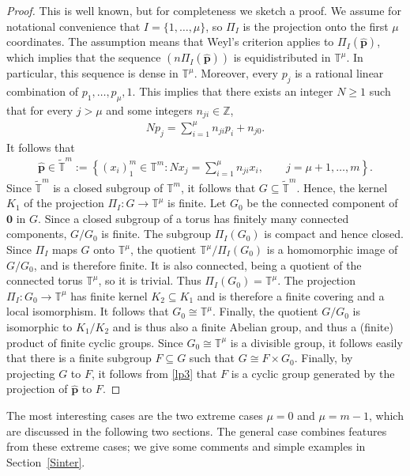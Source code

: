 \documentclass[11pt,reqno,tbtags,a4paper]{amsart}
\numberwithin{equation}{section}
\renewcommand\ge{\geq}
\renewcommand\geq{\geqslant}
\theoremstyle{plain}%
\theoremstyle{definition}
\theoremstyle{remark}
\newcounter{cases}
\newcommand{\refS}[1]{Section~\ref{#1}}
\newcommand\set[1]{\ensuremath{\{#1\}}}
\newcommand\lrset[1]{\ensuremath{\left\{#1\right\}}}
\newcommand\bbT{\mathbb T}
\newcommand\bbZ{\mathbb Z}
\newcommand\hvp{\hat{\mathbf{p}}}
\newcommand\bbTxm{\widetilde{\bbT}^m}
\newcommand\0{{\boldsymbol 0}}
\newcommand\1{{\boldsymbol 1}}
\begin{document}
\begin{proof}
This is well known,
but for completeness we sketch a proof.
We assume for notational convenience that $I=\set{1,\dots,\mu}$,
so $\Pi_I$ is the projection onto the first $\mu$ coordinates. 
The assumption means that Weyl's criterion applies to
$\Pi_I(\hvp)$, which implies that the sequence $(n\Pi_I(\hvp))$ is
equidistributed
in $\bbT^\mu$. In particular, this sequence is dense in $\bbT^\mu$. 
Moreover, every $p_j$ is a rational linear combination of $p_1,\dots,p_\mu,1$.
This implies that there exists an integer $N\ge1$ such that
for every $j>\mu$ and some integers $n_{ji}\in\bbZ$,
\begin{align}
  Np_j = \sum_{i=1}^\mu n_{ji}p_i + n_{j0}.
\end{align}
It follows that
\begin{align}
\hvp\in\bbTxm:=\lrset{(x_i)_1^m\in\bbT^m: Nx_j= \sum_{i=1}^\mu n_{ji}x_i,
\qquad j=\mu+1,\dots,m}.
\end{align}
Since $\bbTxm$ is a closed subgroup of $\bbT^m$, it follows that
$G\subseteq\bbTxm$. Hence, the kernel $K_1$ of the projection
$\Pi_I:G\to\bbT^\mu$ is finite.
Let $G_0$ be the connected component of $\0$ in $G$.
Since a closed subgroup of a torus has finitely many connected components,
$G/G_0$ is finite. The subgroup $\Pi_I(G_0)$ is compact and hence closed.
Since $\Pi_I$ maps $G$ onto $\bbT^\mu$, the quotient
$\bbT^\mu/\Pi_I(G_0)$ is a homomorphic image of $G/G_0$, and is therefore
finite. It is also connected, being a quotient of the connected torus
$\bbT^\mu$, so it is trivial. Thus $\Pi_I(G_0)=\bbT^\mu$.
The projection $\Pi_I:G_0\to\bbT^\mu$ has finite kernel
$K_2\subseteq K_1$ and is therefore a finite covering and a local
isomorphism. It follows that $G_0\cong\bbT^\mu$.
Finally, the quotient $G/G_0$ is isomorphic to $K_1/K_2$ and is thus also
a finite Abelian group, and thus a (finite) product of finite cyclic groups.
Since $G_0\cong \bbT^\mu$ is a divisible group, it follows easily
that there is a finite subgroup $F\subseteq G$ such that $G\cong F\times G_0$.
Finally, by projecting $G$ to $F$, it follows from \eqref{lp3} that $F$ is
a cyclic group generated by the projection of $\hvp$ to $F$.
\end{proof}

The most interesting cases are the two extreme cases $\mu=0$ and $\mu=m-1$,
which are  discussed in the following two sections.
The general case combines features from these extreme cases;
we give some comments and simple examples in \refS{Sinter}.
\end{document}
